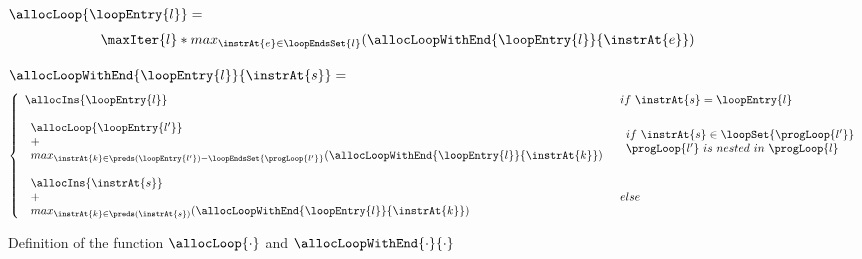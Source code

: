 \begin{figure}[!hbp]
\begin{frameit}
$\allocLoop{\loopEntry{l}} = $
$$ \begin{array}{l}
    \maxIter{l} * max_{ \instrAt{e} \in \loopEndsSet{l}  } (\allocLoopWithEnd{\loopEntry{l}}{\instrAt{e}} )
   \end{array}$$



$\allocLoopWithEnd{\loopEntry{l}}{\instrAt{s}} = $
$$ 
\left\{\begin{array}{ll}

 \allocIns{\loopEntry{l}}  & if \  \instrAt{s} = \loopEntry{l} \\
  & \\
 \begin{array}{l}
           \allocLoop{\loopEntry{l'}} \\
          + \\
      max_{\instrAt{k} \in \preds(\loopEntry{l'} ) - \loopEndsSet{\progLoop{l'}}}
       ( \allocLoopWithEnd{\loopEntry{l}}{\instrAt{k}} )
    \end{array} &  \begin{array}{l}
                                        if \  \instrAt{s} \in  \loopSet{\progLoop{l'}} \\
                                          \progLoop{l'} \ is \  nested \ in \ \progLoop{l}
                                    \end{array} \\
  & \\
  \begin{array}{l}
     \allocIns{\instrAt{s}} \\
     + \\
     max_{\instrAt{k} \in \preds(\instrAt{s} )}
     ( \allocLoopWithEnd{\loopEntry{l}}{\instrAt{k}} )
                       \end{array} & else \\

\end{array} \right.
$$
 \caption{\sc Definition of the function $\allocLoop{\cdot}$ and  $\allocLoopWithEnd{\cdot}{\cdot}$ }
\label{fig:loopPath}
\end{frameit}
\end{figure}


